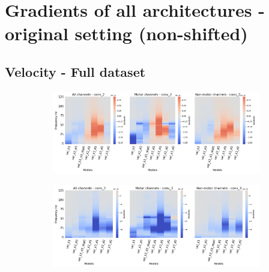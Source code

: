 \chapter{Gradients of all architectures - original setting (non-shifted)}\label{appendixA}


\section*{Velocity - Full dataset}\label{sec:velocity-appendixA}

\begin{figure}[!htb]
\centering
\begin{subfigure}[a]{\textwidth}
   \includegraphics[width=0.85\linewidth]{img/appendix/A/conv-2/m/vel-model-gradients-all_kinds}
   \caption{}
   \label{fig:vel-full-grads-conv2}
\end{subfigure}

\begin{subfigure}[b]{\textwidth}
   \includegraphics[width=0.85\linewidth]{img/appendix/A/conv-3/m/vel-model-gradients-all_kinds}
   \caption{}
   \label{fig:vel-full-grads-conv3}
\end{subfigure}
\end{figure}
\clearpage   

